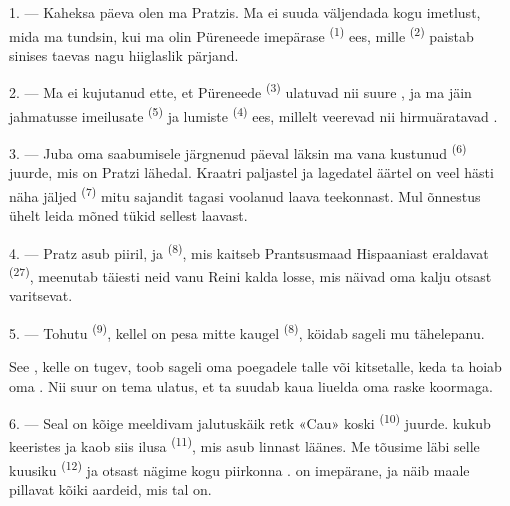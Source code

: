 1. --- Kaheksa päeva olen ma Pratzis. Ma ei suuda väljendada kogu imetlust, mida ma
tundsin, kui ma olin Püreneede imepärase  \textsuperscript{(1)} ees,
mille  \textsuperscript{(2)} paistab sinises taevas nagu hiiglaslik
pärjand.

2. --- Ma ei kujutanud ette, et Püreneede  \textsuperscript{(3)} ulatuvad
nii suure , ja ma jäin jahmatusse imeilusate 
\textsuperscript{(5)} ja lumiste  \textsuperscript{(4)} ees, millelt
veerevad nii hirmuäratavad .

\VUsaut{3.0mm}
\VUsaut{3.0mm}

3. --- Juba oma saabumisele järgnenud päeval läksin ma vana kustunud 
\textsuperscript{(6)} juurde, mis on Pratzi lähedal. Kraatri paljastel ja lagedatel
äärtel on veel hästi näha jäljed  \textsuperscript{(7)} mitu sajandit
tagasi voolanud laava teekonnast. Mul õnnestus ühelt  leida mõned tükid
sellest laavast.

4. --- Pratz asub piiril, ja  \textsuperscript{(8)}, mis kaitseb
Prantsusmaad Hispaaniast eraldavat  \textsuperscript{(27)}, meenutab täiesti
neid vanu Reini kalda losse, mis näivad oma kalju otsast  varitsevat.

5. --- Tohutu  \textsuperscript{(9)}, kellel on pesa mitte kaugel
 \textsuperscript{(8)}, köidab sageli mu tähelepanu.

See , kelle  on tugev, toob sageli oma poegadele talle või
kitsetalle, keda ta hoiab oma . Nii suur on tema 
ulatus, et ta suudab kaua liuelda oma raske koormaga.

\VUsaut{3.0mm}
\VUsaut{3.0mm}

6. --- Seal on kõige meeldivam jalutuskäik retk «Cau» koski \textsuperscript{(10)}
juurde.  kukub keeristes ja kaob siis ilusa 
 \textsuperscript{(11)}, mis asub linnast läänes. Me tõusime läbi selle
kuusiku  \textsuperscript{(12)} ja
 otsast nägime kogu piirkonna .
 on imepärane, ja  näib maale pillavat kõiki aardeid, mis
tal on.

